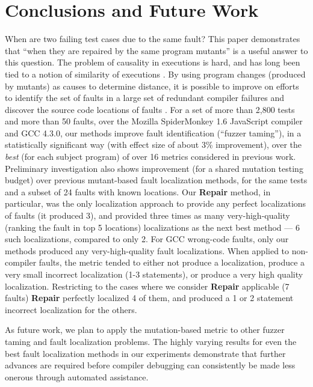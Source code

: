 \section{Conclusions and Future Work}
\label{conc}
When are two failing test cases due to the same fault?  This paper
demonstrates that
``when they are repaired by the same program mutants'' is a useful answer to
this question.  The problem of causality in executions is hard, and
has long been tied to a notion of similarity of
executions \cite{NearNeighbor,GroceError}.  By using program changes
(produced by mutants) as
causes to determine distance, it is possible to improve on efforts
to identify the set of faults in a large set of redundant compiler failures
\cite{PLDI13} and discover the source code locations of faults
\cite{MUSE,multilingual}.  For a set of more than 2,800 tests and more
than 50 faults, over the Mozilla SpiderMonkey 1.6 JavaScript compiler and
GCC 4.3.0, our methods improve fault identification (``fuzzer taming''), in a statistically significant way
(with effect size of about 3\% improvement), over
the \emph{best} (for each subject program) of over 16 metrics considered in previous work.
Preliminary investigation also shows improvement (for a shared
mutation testing budget) over previous mutant-based fault localization
methods, for the same tests and a subset of 24 faults with known
locations.  Our {\bf Repair} method, in particular, was the only
localization approach to provide any perfect localizations of faults
(it produced 3),
and provided three times as many very-high-quality (ranking the fault
in top 5 locations) localizations as the next best method
\cite{multilingual}  --- 6 such localizations, compared to only 2.
For GCC wrong-code faults, only our methods produced any
very-high-quality fault localizations.  When applied to non-compiler
faults, the metric tended to either not produce a localization,
produce a very small incorrect localization (1-3 statements), or
produce a very high quality localization.  Restricting to the cases
where we consider {\bf Repair} applicable (7 faults) {\bf Repair}
perfectly localized 4 of them, and produced a 1 or 2 statement
incorrect localization for the others.

As future work, we plan to apply the mutation-based metric to other
fuzzer taming and fault localization problems.  The highly varying
results for even the best fault localization methods in our
experiments demonstrate that further advances are required before
compiler debugging can consistently be made less onerous through automated
assistance.

